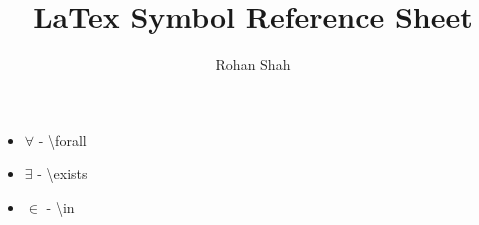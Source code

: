\documentclass[12pt]{article}
\begin{document}
\title{LaTex Symbol Reference Sheet}
\author{Rohan Shah}
\date{}
\maketitle

\begin{itemize}

\item $\forall$ - \textbackslash forall
\item $\exists$ - \textbackslash exists
\item $\in$ - \textbackslash in

\end{itemize}
\end{document}

